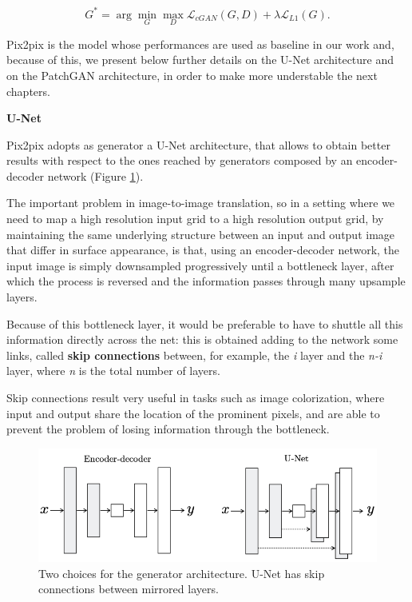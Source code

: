\begin{equation} \label{eq:final_objective}
G^* = \arg\min_{G}\max_{D} \mathcal{L}_{cGAN}(G,D) + \lambda \mathcal{L}_{L1}(G).
\end{equation}

Pix2pix is the model whose performances are used as baseline in our work and, because of this, we present below further details on the U-Net architecture and on the PatchGAN architecture, in order to make more understable the next chapters.

\vspace{6mm} %
\noindent\textbf{U-Net}

\vspace{2mm} %
\noindent Pix2pix adopts as generator a U-Net architecture\cite{unet}, that allows to obtain better results with respect to the ones reached by generators composed by an encoder-decoder network (Figure \ref{fig:unet2}).


The important problem in image-to-image translation, so in a setting where we need to map a high resolution input grid to a high resolution output grid, by maintaining the same underlying structure between an input and output image that differ in surface appearance\cite{pix2pix}, is that, using an encoder-decoder network, the input image is simply downsampled progressively until a bottleneck layer, after which the process is reversed and the information passes through many upsample layers.

Because of this bottleneck layer, it would be preferable to have to shuttle all this information directly across the net: this is obtained adding to the network some links, called \textbf{skip connections} between, for example, the \textit{i} layer and the \textit{n-i} layer, where \textit{n} is the total number of layers. 

\vspace{6mm} %
Skip connections result very useful in tasks such as image colorization, where input and output share the location of the prominent pixels, and are able to prevent the problem of losing information through the bottleneck.

\begin{figure}[H]
\centering
\includegraphics[height=0.18\textheight]{images/unet2.pdf}
\caption[Generator architectures in Pix2Pix network]{Two choices for the generator architecture. U-Net has skip connections between mirrored layers\cite{pix2pix}.}
\label{fig:unet2}
\end{figure}


